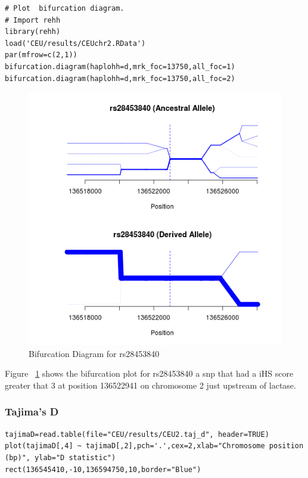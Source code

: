 \documentclass[a4paper,10pt]{article}
\begin{document}
\begin{verbatim}
# Plot  bifurcation diagram.
# Import rehh 
library(rehh)
load('CEU/results/CEUchr2.RData')
par(mfrow=c(2,1))
bifurcation.diagram(haplohh=d,mrk_foc=13750,all_foc=1)
bifurcation.diagram(haplohh=d,mrk_foc=13750,all_foc=2)
\end{verbatim}
\begin{figure}
\centering
\includegraphics{pictures/bifurcationCEU.png}
\caption{Bifurcation Diagram for rs28453840}
\label{fig:bifurcationceu}
\end{figure}

\noindent
Figure ~\ref{fig:bifurcationceu} shows the bifurcation plot for rs28453840 a snp that had a iHS score greater that 3 at position 136522941 on chromosome 2 just upstream of lactase.

\subsubsection{Tajima's D}

\begin{verbatim}
tajimaD=read.table(file="CEU/results/CEU2.taj_d", header=TRUE)
plot(tajimaD[,4] ~ tajimaD[,2],pch='.',cex=2,xlab="Chromosome position (bp)", ylab="D statistic")
rect(136545410,-10,136594750,10,border="Blue") 
\end{verbatim}
\end{document}
